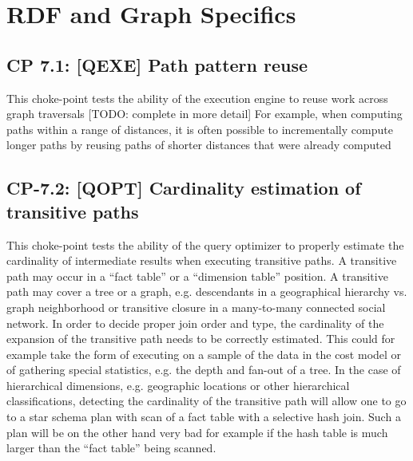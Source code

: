 


\section{RDF and Graph Specifics}

\subsection*{CP 7.1: [QEXE] Path pattern reuse}
\label{choke_point_7.1}
This choke-point tests the ability of the execution engine to reuse work across graph traversals [TODO: complete in more detail]
For example, when computing paths within a range of distances, it is often possible to incrementally compute longer paths by reusing paths of shorter distances that were already computed



\subsection*{CP-7.2: [QOPT] Cardinality estimation of transitive paths}
\label{choke_point_7.2}
This choke-point tests the ability of the query optimizer to properly estimate the cardinality of intermediate results when executing transitive paths. A transitive path may occur in a ``fact table'' or a ``dimension table'' position.
A transitive path may cover a tree or a graph, e.g. descendants in a geographical hierarchy vs. graph neighborhood or transitive closure in a many-to-many connected social network.
In order to decide proper join order and type, the cardinality of the expansion of the transitive path needs to be correctly estimated.
This could for example take the form of executing on a sample of the data in the cost model or of gathering special statistics, e.g. the depth and fan-out of a tree. In the case of hierarchical dimensions,
e.g. geographic locations or other hierarchical classifications, detecting the cardinality of the transitive path will allow one to go to a star schema plan with scan of a fact table with a selective hash join.
Such a plan will be on the other hand very bad for example if the hash table is much larger than the ``fact table'' being scanned.

